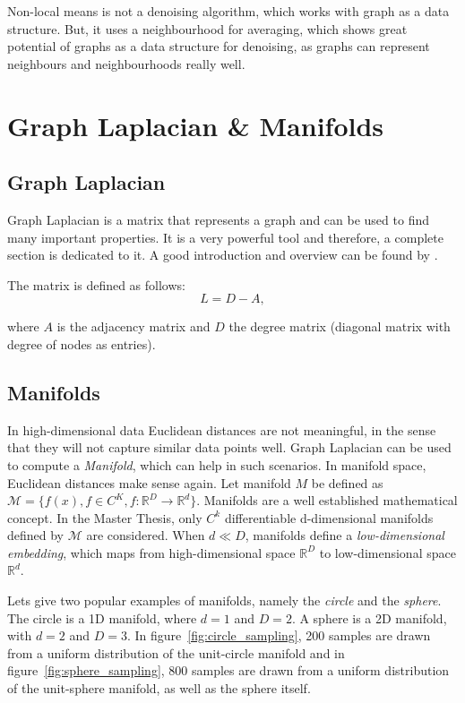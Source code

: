 Non-local means is not a denoising algorithm, which works with graph as a data structure.
But, it uses a neighbourhood for averaging, which shows great potential of graphs
as a data structure for denoising, as graphs can represent neighbours and neighbourhoods really well.


\section{Graph Laplacian \& Manifolds}
\subsection{Graph Laplacian}
Graph Laplacian is a matrix that represents a graph and can be used to find many important properties.
It is a very powerful tool and therefore, a complete section is dedicated to it.
A good introduction and overview can be found by \cite{tutorialSpectralClustering, SpectralGraphTheory}. 

The matrix is defined as follows:
\begin{equation}
    L = D - A,
\end{equation}

where $A$ is the adjacency matrix and $D$ the degree matrix (diagonal matrix with degree of nodes as entries).

\subsection{Manifolds}
\label{sec:manifolds}

In high-dimensional data Euclidean distances are not meaningful,
in the sense that they will not capture similar data points well.
Graph Laplacian can be used to compute a \textit{Manifold}, which can help in such scenarios. 
In manifold space, Euclidean distances make sense again. 
Let manifold $M$ be defined as $\mathcal{M} = \{ f(x), f \in C^K, f: \mathbb{R}^D \to \mathbb{R}^d \}$.
Manifolds are a well established mathematical concept. In the Master Thesis, only 
$C^k$ differentiable d-dimensional manifolds defined by $\mathcal{M}$ are considered. 
When $d \ll D$, manifolds define a \textit{low-dimensional embedding}, which maps from high-dimensional space 
$\mathbb{R}^D$ to low-dimensional space $\mathbb{R}^d$.

Lets give two popular examples of manifolds, namely the \textit{circle} and the \textit{sphere}.
The circle is a 1D manifold, where $d=1$ and $D=2$. A sphere is a 2D manifold, with $d=2$ and $D=3$.
In figure~\ref{fig:circle_sampling}, 200 samples are drawn from a uniform distribution of the unit-circle manifold
and in figure~\ref{fig:sphere_sampling}, 800 samples are drawn from a uniform distribution of the unit-sphere manifold,
as well as the sphere itself.

